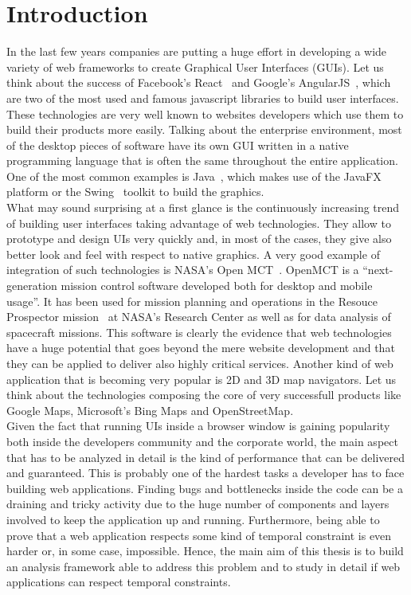 \chapter{Introduction} \label{cha:intro}

In the last few years companies are putting a huge effort in developing a wide variety of 
web frameworks to create Graphical User Interfaces (GUIs). Let us think about the success of Facebook's
React~\cite{fbreact} and Google's AngularJS~\cite{angularjs}, which are two of the most
used and famous javascript libraries to build user interfaces.
These technologies are very well known to websites developers which use them to
build their products more easily.
Talking about the enterprise environment, most of the desktop pieces of software have its own GUI
written in a native programming language that is often the same throughout the entire application.
One of the most common examples is Java~\cite{gosling1995java}, which makes use of the JavaFX~\cite{javafx}
platform or the Swing~\cite{javaswing} toolkit to build the graphics.\\
What may sound surprising at a first glance is the continuously increasing trend of 
building user interfaces taking advantage of web technologies.
They allow to prototype and design UIs very quickly and, in
most of the cases, they give also better look and feel with respect to native graphics.
A very good example of integration of such technologies is NASA's Open MCT~\cite{openmct}.
OpenMCT is a ``next-generation mission control software developed both for desktop and mobile
usage''. It has been used for mission planning and operations in the Resouce 
Prospector mission~\cite{andrews2014introducing} at NASA's Research Center as well as for
data analysis of spacecraft missions. This software is clearly the evidence that web
technologies have a huge potential that goes beyond the mere website development and that they 
can be applied to deliver also highly critical services.
Another kind of web application that is becoming very popular is 2D and 3D map navigators.
Let us think about the technologies composing the core of very successfull products like
Google Maps, Microsoft's Bing Maps and OpenStreetMap.\\
Given the fact that running UIs inside a browser window is gaining popularity both inside the
developers community and the corporate world, the main aspect that has to be analyzed
in detail is the kind of performance that can be delivered and guaranteed. This is probably one of
the hardest tasks a developer has to face building web applications. Finding bugs
and bottlenecks inside the code can be a draining and tricky activity due to the huge number
of components and layers involved to keep the application up and running. Furthermore,
being able to prove that a web application respects some kind of temporal constraint
is even harder or, in some case, impossible. Hence, the main aim of this thesis is
to build an analysis framework able to address this problem and to study in detail
if web applications can respect temporal constraints.

